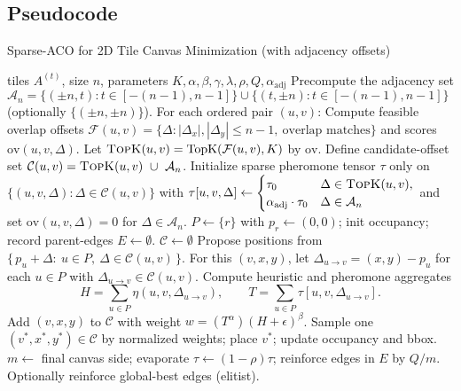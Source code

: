 \documentclass[11pt]{article}
\begin{document}
\subsection{Pseudocode}
\begin{algorithm}[H]
\caption{Sparse-ACO for 2D Tile Canvas Minimization (with adjacency offsets)}
\begin{algorithmic}[1]
\Require tiles $A^{(t)}$, size $n$, parameters $K,\alpha,\beta,\gamma,\lambda,\rho,Q,\alpha_{\mathrm{adj}}$
\State Precompute the adjacency set $\mathcal{A}_n=\{(\pm n,t):t\in[-(n-1),n-1]\}\cup\{(t,\pm n):t\in[-(n-1),n-1]\}$ (optionally $\{(\pm n,\pm n)\}$).
\State For each ordered pair $(u,v)$:
\State \hspace{1em} Compute feasible overlap offsets $\mathcal{F}(u,v)=\{\Delta:|\Delta_x|,|\Delta_y|\le n-1,\ \text{overlap matches}\}$ and scores $\mathrm{ov}(u,v,\Delta)$.
\State \hspace{1em} Let $\textsc{TopK}(u,v)=\operatorname{TopK}(\mathcal{F}(u,v),K)$ by $\mathrm{ov}$.
\State \hspace{1em} Define candidate-offset set $\mathcal{C}(u,v)=\textsc{TopK}(u,v)\ \cup\ \mathcal{A}_n$.
\State Initialize sparse pheromone tensor $\tau$ only on $\{(u,v,\Delta):\Delta\in\mathcal{C}(u,v)\}$ with
\State \hspace{1em} $\tau[u,v,\Delta]\gets
\begin{cases}
\tau_0 & \Delta\in\textsc{TopK}(u,v),\\
\alpha_{\mathrm{adj}}\cdot\tau_0 & \Delta\in\mathcal{A}_n
\end{cases}$ \quad and set $\mathrm{ov}(u,v,\Delta)=0$ for $\Delta\in\mathcal{A}_n$.
    \State $P\gets\{r\}$ with $p_r\gets(0,0)$; init occupancy; record parent-edges $E\gets\emptyset$.
      \State $\mathcal{C}\gets\emptyset$ 
        \State Propose positions from $\{\,p_u+\Delta:\ u\in P,\ \Delta\in\mathcal{C}(u,v)\,\}$.
          \State For this $(v,x,y)$, let $\Delta_{u\to v}=(x,y)-p_u$ for each $u\in P$ with $\Delta_{u\to v}\in\mathcal{C}(u,v)$.
          \State Compute heuristic and pheromone aggregates
          \[
          H=\sum_{u\in P}\eta(u,v,\Delta_{u\to v}),\qquad
          T=\sum_{u\in P}\tau[u,v,\Delta_{u\to v}].
          \]
          \State Add $(v,x,y)$ to $\mathcal{C}$ with weight $w=(T^{\alpha})(H+\epsilon)^{\beta}$. %
        \EndFor
      \EndFor
      \State Sample one $(v^*,x^*,y^*)\in\mathcal{C}$ by normalized weights; place $v^*$; update occupancy and bbox.
    \EndWhile
    \State $m\gets$ final canvas side; evaporate $\tau\leftarrow(1-\rho)\tau$; reinforce edges in $E$ by $Q/m$.
  \EndFor
  \State Optionally reinforce global-best edges (elitist).
\EndFor
\end{algorithmic}
\end{algorithm}
\end{document}
